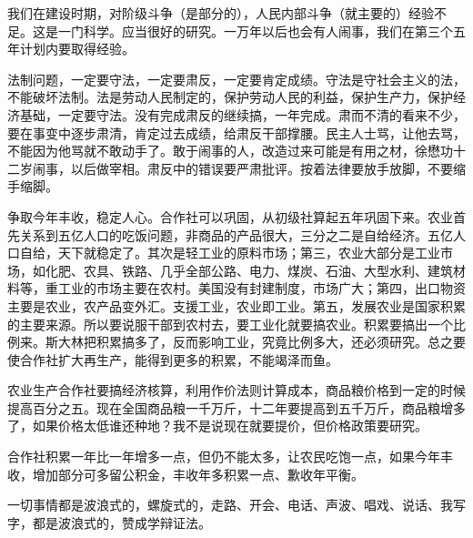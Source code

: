 我们在建设时期，对阶级斗争（是部分的），人民内部斗争（就主要的）经验不足。这是一门科学。应当很好的研究。一万年以后也会有人闹事，我们在第三个五年计划内要取得经验。

法制问题，一定要守法，一定要肃反，一定要肯定成绩。守法是守社会主义的法，不能破坏法制。法是劳动人民制定的，保护劳动人民的利益，保护生产力，保护经济基础，一定要守法。没有完成肃反的继续搞，一年完成。肃而不清的看来不少，要在事变中逐步肃清，肯定过去成绩，给肃反干部撑腰。民主人士骂，让他去骂，不能因为他骂就不敢动手了。敢于闹事的人，改造过来可能是有用之材，徐懋功十二岁闹事，以后做宰相。肃反中的错误要严肃批评。按着法律要放手放脚，不要缩手缩脚。

争取今年丰收，稳定人心。合作社可以巩固，从初级社算起五年巩固下来。农业首先关系到五亿人口的吃饭问题，非商品的产品很大，三分之二是自给经济。五亿人口自给，天下就稳定了。其次是轻工业的原料市场；第三，农业大部分是工业市场，如化肥、农具、铁路、几乎全部公路、电力、煤炭、石油、大型水利、建筑材料等，重工业的市场主要在农村。美国没有封建制度，市场广大；第四，出口物资主要是农业，农产品变外汇。支援工业，农业即工业。第五，发展农业是国家积累的主要来源。所以要说服干部到农村去，要工业化就要搞农业。积累要搞出一个比例来。斯大林把积累搞多了，反而影响工业，究竟比例多大，还必须研究。总之要使合作社扩大再生产，能得到更多的积累，不能竭泽而鱼。

农业生产合作社要搞经济核算，利用作价法则计算成本，商品粮价格到一定的时候提高百分之五。现在全国商品粮一千万斤，十二年要提高到五千万斤，商品粮增多了，如果价格太低谁还种地？我不是说现在就要提价，但价格政策要研究。

合作社积累一年比一年增多一点，但仍不能太多，让农民吃饱一点，如果今年丰收，增加部分可多留公积金，丰收年多积累一点、歉收年平衡。

一切事情都是波浪式的，螺旋式的，走路、开会、电话、声波、唱戏、说话、我写字，都是波浪式的，赞成学辩证法。


